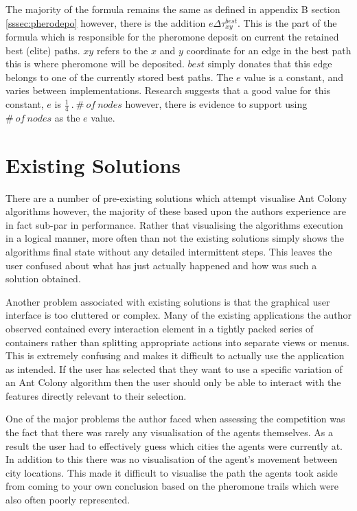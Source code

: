 The majority of the formula remains the same as defined in appendix B section \ref{sssec:pherodepo} however, there is the addition $e\Delta\tau_{xy}^{best}$. This is the part of the formula which is responsible for the pheromone deposit on current the retained best (elite) paths. $xy$ refers to the $x$ and $y$ coordinate for an edge in the best path this is where pheromone will be deposited. $best$ simply donates that this edge belongs to one of the currently stored best paths. The $e$ value is a constant, and varies between implementations. Research suggests that a good value for this constant, $e$ is $\frac{1}{4}\ .\ \#\ of \ nodes$ \cite{sjored:Thesus2012:evalue} however, there is evidence to support using $\#\ of \ nodes$ as the $e$ value\cite{marcdorgio:book:nopage}.

\section{Existing Solutions}
\label{existingsolutions}
There are a number of pre-existing solutions which attempt visualise Ant Colony algorithms however, the majority of these based upon the authors experience are in fact sub-par in performance. Rather that visualising the algorithms execution in a logical manner, more often than not the existing solutions simply shows the algorithms final state without any detailed intermittent steps. This leaves the user confused about what has just actually happened and how was such a solution obtained.

Another problem associated with existing solutions is that the graphical user interface is too cluttered or complex. Many of the existing applications the author observed contained every interaction element in a tightly packed series of containers rather than splitting appropriate actions into separate views or menus. This is extremely confusing and makes it difficult to actually use the application as intended. If the user has selected that they want to use a specific variation of an Ant Colony algorithm then the user should only be able to interact with the features directly relevant to their selection.

One of the major problems the author faced when assessing the competition was the fact that there was rarely any visualisation of the agents themselves. As a result the user had to effectively guess which cities the agents were currently at. In addition to this there was no visualisation of the agent’s movement between city locations. This made it difficult to visualise the path the agents took aside from coming to your own conclusion based on the pheromone trails which were also often poorly represented.

